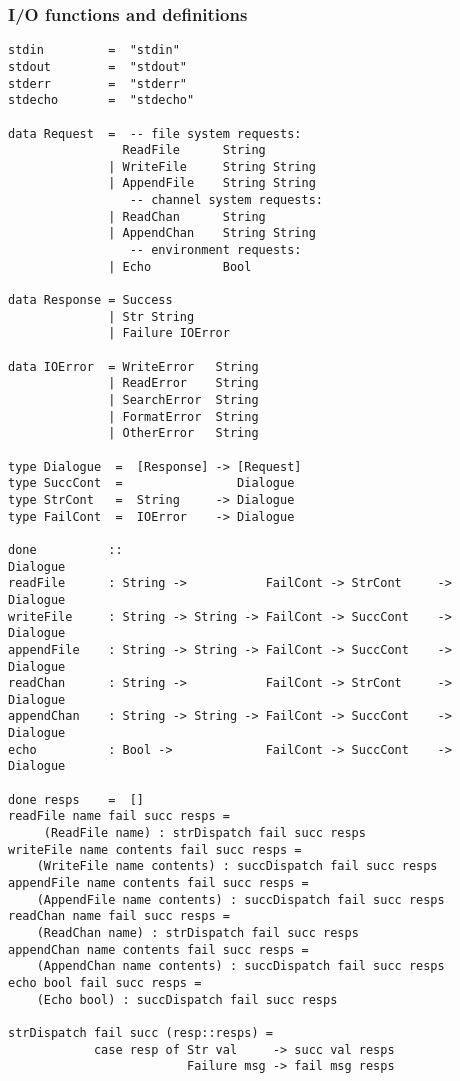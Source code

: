 \subsubsection*{I/O functions and definitions}
\begin{verbatim}
stdin         =  "stdin"
stdout        =  "stdout"
stderr        =  "stderr"
stdecho       =  "stdecho"

data Request  =  -- file system requests:
                ReadFile      String         
              | WriteFile     String String
              | AppendFile    String String
                 -- channel system requests:
              | ReadChan      String 
              | AppendChan    String String
                 -- environment requests:
              | Echo          Bool

data Response = Success
              | Str String 
              | Failure IOError

data IOError  = WriteError   String
              | ReadError    String
              | SearchError  String
              | FormatError  String
              | OtherError   String

type Dialogue  =  [Response] -> [Request]
type SuccCont  =                Dialogue
type StrCont   =  String     -> Dialogue
type FailCont  =  IOError    -> Dialogue
 
done          ::                                                Dialogue
readFile      : String ->           FailCont -> StrCont     -> Dialogue
writeFile     : String -> String -> FailCont -> SuccCont    -> Dialogue
appendFile    : String -> String -> FailCont -> SuccCont    -> Dialogue
readChan      : String ->           FailCont -> StrCont     -> Dialogue
appendChan    : String -> String -> FailCont -> SuccCont    -> Dialogue
echo          : Bool ->             FailCont -> SuccCont    -> Dialogue

done resps    =  []
readFile name fail succ resps =
     (ReadFile name) : strDispatch fail succ resps
writeFile name contents fail succ resps =
    (WriteFile name contents) : succDispatch fail succ resps
appendFile name contents fail succ resps =
    (AppendFile name contents) : succDispatch fail succ resps
readChan name fail succ resps =
    (ReadChan name) : strDispatch fail succ resps
appendChan name contents fail succ resps =
    (AppendChan name contents) : succDispatch fail succ resps
echo bool fail succ resps =
    (Echo bool) : succDispatch fail succ resps

strDispatch fail succ (resp::resps) = 
            case resp of Str val     -> succ val resps
                         Failure msg -> fail msg resps


\end{verbatim}
